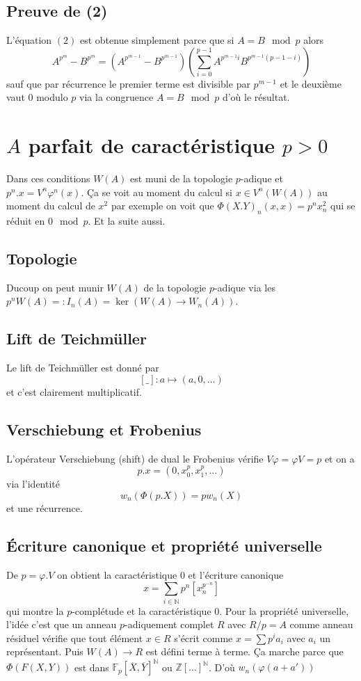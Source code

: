 \documentclass[a4paper,12pt]{article}
\newcommand{\Z}{\mathbb{Z}}
\newcommand{\N}{\mathbb{N}}
\newcommand{\F}{\mathbb F}
\theoremstyle{plain}
\theoremstyle{definition}
\theoremstyle{remark}
\begin{document}
\subsection{Preuve de (2)}
L'équation $(2)$ est obtenue simplement parce que si 
$A=B\mod p$ alors 
\[A^{p^m}-B^{p^m}=(A^{p^{m-1}}-B^{p^{m-1}})\left(\sum_{i=0}^{p-1} A^{p^{m-1}i}B^{p^{m-1}(p-1-i)}\right)\]
sauf que par récurrence le premier terme est divisible par
$p^{m-1}$ et le deuxième vaut $0$ modulo $p$ via la congruence
$A=B\mod p$ d'où le résultat.


\section{$A$ parfait de caractéristique $p>0$}
Dans ces conditions $W(A)$ est muni de la topologie $p$-adique et
$p^n.x=V^n\varphi^n(x)$. Ça se voit au moment du calcul si 
$x\in V^n(W(A))$ au moment du calcul de $x^2$ par exemple on voit
que $\Phi(X.Y)_n(x,x)=p^nx_n^2$ qui se réduit en $0\mod p$. Et
la suite aussi.

\subsection{Topologie}
Ducoup on peut munir $W(A)$ de la topologie $p$-adique via les
$p^nW(A)=:I_n(A)=\ker(W(A)\to W_n(A))$. 

\subsection{Lift de Teichmüller}
Le lift de Teichmüller est donné par
\[[\_]\colon a\mapsto (a,0,\ldots)\]
et c'est clairement multiplicatif.
\subsection{Verschiebung et Frobenius}
L'opérateur Verschiebung (shift) de dual le Frobenius vérifie
$V\varphi=\varphi V=p$ et on a 
\[p.x=(0,x_0^p,x_1^p,\ldots)\]
via l'identité 
\[w_n(\Phi(p.X))=pw_n(X)\]
et une récurrence. 

\subsection{Écriture canonique et propriété universelle}
De $p=\varphi.V$ on obtient la caractéristique $0$ et l'écriture
canonique
\[x=\sum_{i\in \N}p^n[x_n^{p^{-n}}]\]
qui montre la $p$-complétude et la caractéristique $0$. Pour
la propriété universelle, l'idée c'est que un anneau $p$-adiquement
complet $R$ avec $R/p=A$ comme anneau résiduel vérifie que tout 
élément $x\in R$ s'écrit comme $ x=\sum p^ia_i$ avec $a_i$ un
représentant. Puis $W(A)\to R$ est défini terme à terme. Ça
marche parce que $\Phi(F(X,Y))$ est dans $\F_p[\overline X,\overline Y]^\N$
ou $\Z[\ldots]^\N$. D'où $w_n(\varphi(a+a'))$
\end{document}
